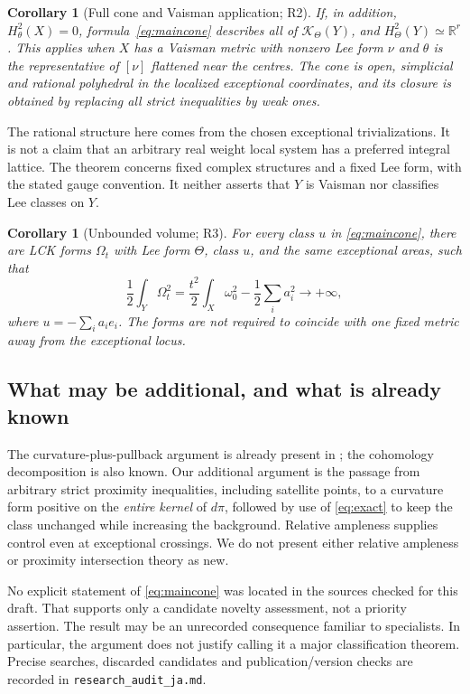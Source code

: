 \documentclass[12pt]{amsart}
\newtheorem{cor}[thm]{Corollary}
\theoremstyle{definition}
\theoremstyle{remark}
\numberwithin{equation}{section}
\newcommand{\cK}{\mathcal{K}}
\newcommand{\R}{\mathbb{R}}
\begin{document}
\begin{cor}[Full cone and Vaisman application; R2]\label{cor:full}
If, in addition, $H^2_\theta(X)=0$, formula~\eqref{eq:maincone} describes all of $\cK_\Theta(Y)$, and $H^2_\Theta(Y)\simeq\R^r$. This applies when $X$ has a Vaisman metric with nonzero Lee form $\nu$ and $\theta$ is the representative of $[\nu]$ flattened near the centres. The cone is open, simplicial and rational polyhedral in the localized exceptional coordinates, and its closure is obtained by replacing all strict inequalities by weak ones.
\end{cor}

The rational structure here comes from the chosen exceptional trivializations. It is not a claim that an arbitrary real weight local system has a preferred integral lattice. The theorem concerns fixed complex structures and a fixed Lee form, with the stated gauge convention. It neither asserts that $Y$ is Vaisman nor classifies Lee classes on $Y$.

\begin{cor}[Unbounded volume; R3]\label{cor:volume}
For every class $u$ in \eqref{eq:maincone}, there are LCK forms $\Omega_t$ with Lee form $\Theta$, class $u$, and the same exceptional areas, such that
\begin{equation}\label{eq:volasym}
 \frac12\int_Y\Omega_t^2
 =\frac{t^2}{2}\int_X\omega_0^2-\frac12\sum_i a_i^2\longrightarrow+\infty,
\end{equation}
where $u=-\sum_i a_ie_i$. The forms are not required to coincide with one fixed metric away from the exceptional locus.
\end{cor}

\subsection{What may be additional, and what is already known}
The curvature-plus-pullback argument is already present in \cite[Lemma 3.4]{OVV}; the cohomology decomposition is also known. Our additional argument is the passage from arbitrary strict proximity inequalities, including satellite points, to a curvature form positive on the \emph{entire kernel} of $d\pi$, followed by use of \eqref{eq:exact} to keep the class unchanged while increasing the background. Relative ampleness supplies control even at exceptional crossings. We do not present either relative ampleness or proximity intersection theory as new.

No explicit statement of \eqref{eq:maincone} was located in the sources checked for this draft. That supports only a candidate novelty assessment, not a priority assertion. The result may be an unrecorded consequence familiar to specialists. In particular, the argument does not justify calling it a major classification theorem. Precise searches, discarded candidates and publication/version checks are recorded in \texttt{research\_audit\_ja.md}.
\end{document}

